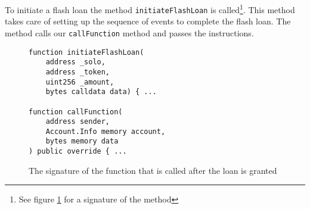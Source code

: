 To initiate a flash loan the method \verb|initiateFlashLoan| is
called\footnote{See figure \ref{signature} for a signature of the method}.
This method takes care of setting up the sequence of events to complete the
flash loan. The method calls our \verb|callFunction| method and passes the
instructions.

\begin{figure}[h]
\begin{lstlisting}[language=Solidity]
function initiateFlashLoan(
    address _solo,
    address _token,
    uint256 _amount,
    bytes calldata data) { ...

function callFunction(
    address sender,
    Account.Info memory account,
    bytes memory data
) public override { ...
\end{lstlisting}
    \caption{The signature of the function that is called after the loan is
    granted}
    \label{signature}
\end{figure}
